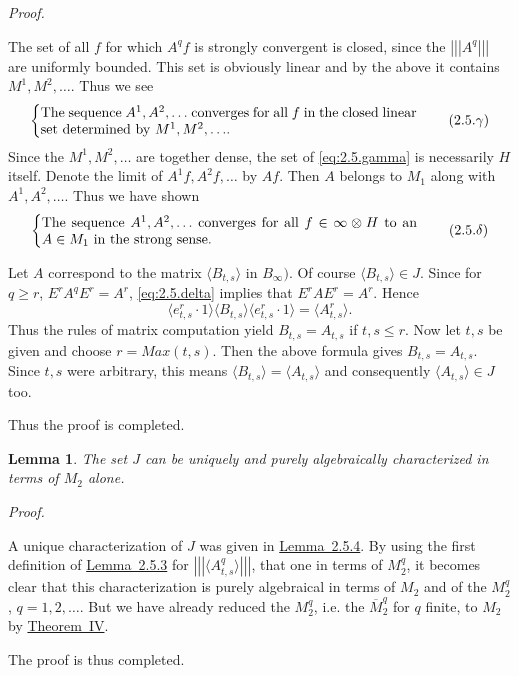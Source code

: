 \documentclass[b5paper,twoside]{article}
\newcommand{\thmref}[2]{\hyperref[#1]{\mbox{Theorem~#2}}}
\newcommand{\lemref}[2]{\hyperref[#1]{\mbox{Lemma~#2}}}
\theoremstyle{mvnplain}
\newtheorem{lemma}{Lemma}[section]
\renewenvironment{proof}[1][Proof]{%
  \par\addvspace{0.35\baselineskip}%
  \noindent\textit{#1.}\ \normalfont\ignorespaces
}{%
  \par\addvspace{0.35\baselineskip}%
}
\newcommand{\M}{\mathbf M}
\newcommand{\Hilbert}{\mathfrak H}
\newcommand{\OpNorm}[1]{\left\lvert\left\lvert\left\lvert#1\right\rvert\right\rvert\right\rvert}
\def\M{M}%
\def\Hilbert{H}%
\def\operatorname#1{#1}%
\def\mathfrak#1{#1}%
\begin{document}
\begin{proof}
The set of all $f$ for which $A^qf$ is strongly convergent is closed, since
the $\OpNorm{A^q}$ are uniformly bounded.  This set is obviously linear and
by the above it contains
$\mathfrak M^1,\mathfrak M^2,\ldots$.  Thus we see
\begin{equation}
  \left\{
  \begin{minipage}{0.78\linewidth}
  The sequence $A^1,A^2,\ldots$ converges for all $f$ in the closed linear
  set determined by $\mathfrak M^1,\mathfrak M^2,\ldots$.
  \end{minipage}
  \right.
  \tag{2.5.\ensuremath{\gamma}}\label{eq:2.5.gamma}
\end{equation}
Since the $\mathfrak M^1,\mathfrak M^2,\ldots$ are together dense, the set
of \eqref{eq:2.5.gamma} is necessarily $\Hilbert$ itself.
Denote the limit of $A^1f,A^2f,\ldots$ by $Af$.  Then $A$ belongs to $\M_1$
along with $A^1,A^2,\ldots$.  Thus we have shown
\begin{equation}
  \left\{
  \begin{minipage}{0.78\linewidth}
  The sequence $A^1,A^2,\ldots$ converges for all
  $f\in\infty\otimes\Hilbert$ to an $A\in\M_1$ in the strong sense.
  \end{minipage}
  \right.
  \tag{2.5.\ensuremath{\delta}}\label{eq:2.5.delta}
\end{equation}

Let $A$ correspond to the matrix $\langle B_{t,s}\rangle$ in $B_\infty)$.
Of course $\langle B_{t,s}\rangle\in\mathfrak J$.  Since for $q\geq r$,
$E^rA^qE^r=A^r$, \eqref{eq:2.5.delta} implies that $E^rAE^r=A^r$.
Hence
\[
  \langle e^r_{t,s}\cdot1\rangle
  \langle B_{t,s}\rangle
  \langle e^r_{t,s}\cdot1\rangle
  =\langle A^r_{t,s}\rangle.
\]
Thus the rules of matrix computation yield $B_{t,s}=A_{t,s}$ if
$t,s\leq r$.  Now let $t,s$ be given and choose
$r=\operatorname{Max}(t,s)$.  Then the above formula gives
$B_{t,s}=A_{t,s}$.  Since $t,s$ were arbitrary, this means
$\langle B_{t,s}\rangle=\langle A_{t,s}\rangle$ and consequently
$\langle A_{t,s}\rangle\in\mathfrak J$ too.

Thus the proof is completed.
\end{proof}

\begin{lemma}\label{lem:2.5.5}
The set $\mathfrak J$ can be uniquely and purely algebraically characterized
in terms of $\M_2$ alone.
\end{lemma}
\begin{proof}
A unique characterization of $\mathfrak J$ was given in
\lemref{lem:2.5.4}{2.5.4}.  By using the first definition of
\lemref{lem:2.5.3}{2.5.3} for
$\OpNorm{\langle A^q_{t,s}\rangle}$, that one in terms of $\M_2^q$, it
becomes clear that this characterization is purely algebraical in terms of
$\M_2$ and of the $\M_2^q$, $q=1,2,\ldots$.  But we have already reduced the
$\M_2^q$, i.e. the $\overline{\M}_2^q$ for $q$ finite, to $\M_2$ by
\thmref{thm:IV}{IV}.

The proof is thus completed.
\end{proof}
\end{document}
